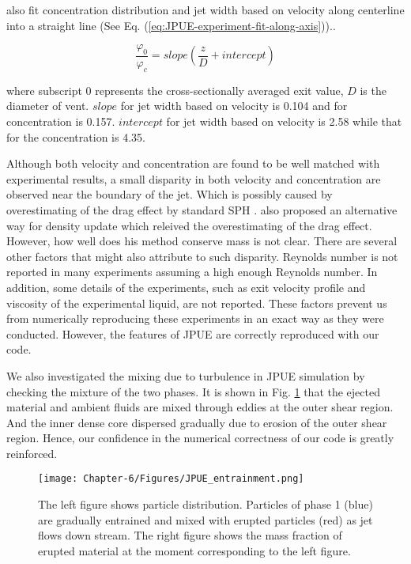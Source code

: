 \citet{papanicolaou1988investigations} also fit concentration distribution and jet width based on velocity along centerline into a straight line (See Eq. (\ref{eq:JPUE-experiment-fit-along-axis})).. 

\begin{equation}
\dfrac{\varphi_0}{\varphi_c}=slope \left(\dfrac{z}{D} + intercept \right)
\label{eq:JPUE-experiment-fit-along-axis}
\end{equation}

where subscript $0$ represents the cross-sectionally averaged exit value, $D$ is the diameter of vent. 
$slope$ for jet width based on velocity is 0.104 and for concentration is 0.157. 
$intercept$ for jet width based on velocity is 2.58 while that for the concentration is 4.35.

Although both velocity and concentration are found to be well matched with experimental results, a small disparity in both velocity and concentration are observed near the boundary of the jet. Which is possibly caused by overestimating of the drag effect by standard SPH \citep {ritchie2001multiphase}. \citet {ritchie2001multiphase} also proposed an alternative way for density update which releived the overestimating of the drag effect. However, how well does his method conserve mass is not clear. There are several other factors that might also attribute to such disparity. Reynolds number is not reported in many experiments assuming a high enough Reynolds number. In addition, some details of the experiments, such as exit velocity profile and viscosity of the experimental liquid, are not reported. These factors prevent us from numerically reproducing these experiments in an exact way as they were conducted. However, the features of JPUE are correctly reproduced with our code.

We also investigated the mixing due to turbulence in JPUE simulation by checking the mixture of the two phases. It is shown in Fig. \ref{fig:Turb_mixing} that the ejected material and ambient fluids are mixed through eddies at the outer shear region. And the inner dense core dispersed gradually due to erosion of the outer shear region. Hence, our confidence in the numerical correctness of our code is greatly reinforced.

\begin{figure}
\centering
\texttt{[image: Chapter-6/Figures/JPUE\_entrainment.png]}
\caption{The left figure shows particle distribution. Particles of phase 1 (blue) are gradually entrained and mixed with erupted particles (red) as jet flows down stream. The right figure shows the mass fraction of erupted material at the moment corresponding to the left figure.}
\label{fig:Turb_mixing}
\end{figure}

